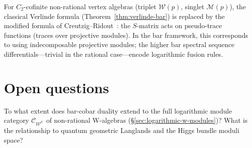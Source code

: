 \begin{remark}
\label{rem:modified-verlinde}
For $C_2$-cofinite non-rational vertex algebras (triplet $\mathcal{W}(p)$, singlet $\mathcal{M}(p)$), the classical Verlinde formula (Theorem~\ref{thm:verlinde-bar}) is replaced by the modified formula of Creutzig--Ridout~\cite{CreutzigRidout2013}: the $S$-matrix acts on pseudo-trace functions (traces over projective modules).  In the bar framework, this corresponds to using indecomposable projective modules; the higher bar spectral sequence differentials---trivial in the rational case---encode logarithmic fusion rules.
\end{remark}

\section{Open questions}

\begin{question}
\label{q:log-w-koszul}
To what extent does bar-cobar duality extend to the full logarithmic module category $\mathcal{C}_{\mathcal{W}^{k'}}$ of non-rational W-algebras (\S\ref{sec:logarithmic-w-modules})?
What is the relationship to quantum geometric Langlands and the Higgs bundle moduli space?
\end{question}
